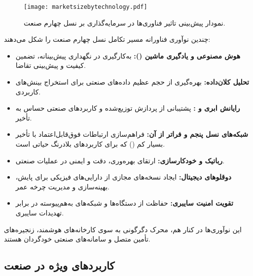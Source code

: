 \vspace{0.5cm}
\begin{figure}[h]
\centering
\texttt{[image: marketsizebytechnology.pdf]}
\caption{نمودار پیش‌بینی تاثیر فناوری‌ها در سرمایه‌گذاری بر نسل چهارم صنعت\cite{GM2025Rise}.}
\label{figure:4IR_TechMar}
\end{figure}
\vspace{0.5cm}

چندین نوآوری فناورانه مسیر تکامل نسل چهارم صنعت را شکل می‌دهند\cite{Xu2018Industry4,Tyagi2021Industry4}:

\begin{itemize}
\item
\textbf{هوش مصنوعی و یادگیری ماشین ():} به‌کارگیری در نگهداری پیش‌بینانه، تضمین کیفیت و پیش‌بینی تقاضا.

\item
\textbf{تحلیل کلان‌داده:} بهره‌گیری از حجم عظیم داده‌های صنعتی برای استخراج بینش‌های کاربردی.

\item
\textbf{رایانش ابری و :} پشتیبانی از پردازش توزیع‌شده و کاربردهای صنعتی حساس به تأخیر.

\item
\textbf{شبکه‌‌های نسل پنجم و فراتر از آن:} فراهم‌سازی ارتباطات فوق‌قابل‌اعتماد با تأخیر بسیار کم () که برای کاربردهای بلادرنگ حیاتی است.

\item
\textbf{رباتیک و خودکارسازی:} ارتقای بهره‌وری، دقت و ایمنی در عملیات صنعتی.

\item
\textbf{دوقلوهای دیجیتال:} ایجاد نسخه‌های مجازی از دارایی‌های فیزیکی برای پایش، بهینه‌سازی و مدیریت چرخه عمر.

\item
\textbf{تقویت امنیت سایبری:} حفاظت از دستگاه‌ها و شبکه‌های به‌هم‌پیوسته در برابر تهدیدات سایبری.
\end{itemize}

این نوآوری‌ها در کنار هم، محرک دگرگونی به سوی کارخانه‌های هوشمند، زنجیره‌های تأمین متصل و سامانه‌های صنعتی خودگردان هستند.

\subsection{کاربردهای ویژه در صنعت}
